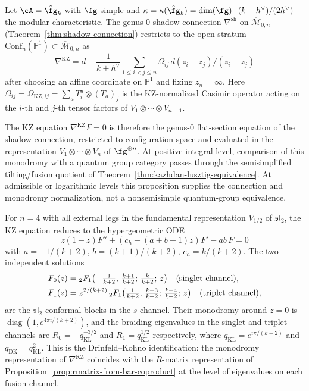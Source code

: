 \begin{proposition}
\label{prop:kz-from-shadow}
Let $\cA = \hat\fg_k$ with $\fg$ simple and
$\kappa = \kappa(\hat\fg_k) = \dim(\fg) \cdot (k + h^\vee)/(2h^\vee)$
the modular characteristic. The genus-$0$ shadow connection
$\nabla^{\mathrm{sh}}$ on $\overline{\mathcal{M}}_{0,n}$
\textup{(}Theorem~\textup{\ref{thm:shadow-connection})} restricts to
the open stratum $\mathrm{Conf}_n(\mathbb{P}^1) \subset
\overline{\mathcal{M}}_{0,n}$ as
\begin{equation}\label{eq:kz-from-shadow}
\nabla^{\mathrm{KZ}}
= d - \frac{1}{k + h^\vee}
 \sum_{1 \le i < j \le n}
 \Omega_{ij}\, d(z_i - z_j)/(z_i - z_j)
\end{equation}
after choosing an affine coordinate on $\mathbb{P}^1$ and
fixing $z_n = \infty$. Here
$\Omega_{ij}=\Omega_{\mathrm{KZ},ij}
=\sum_a T^a_i \otimes (T_a)_j$ is the KZ-normalized Casimir operator
acting on the $i$-th and $j$-th tensor factors of
$V_1 \otimes \cdots \otimes V_{n-1}$.

The KZ equation $\nabla^{\mathrm{KZ}} F = 0$ is therefore the
genus-$0$ flat-section equation of the shadow connection,
restricted to configuration space and evaluated in the representation
$V_1 \otimes \cdots \otimes V_n$ of $\fg^{\oplus n}$.
At positive integral level, comparison of this monodromy with a
quantum group category passes through the semisimplified
tilting/fusion quotient of
Theorem~\ref{thm:kazhdan-lusztig-equivalence}. At admissible or
logarithmic levels this proposition supplies the connection and
monodromy normalization, not a nonsemisimple quantum-group
equivalence.

For $n = 4$ with all external legs in the fundamental representation
$V_{1/2}$ of $\mathfrak{sl}_2$, the KZ equation reduces to the
hypergeometric ODE
\[
z(1-z) F'' + (c_h - (a + b + 1)z) F' - ab\, F = 0
\]
with $a = -1/(k+2)$, $b = (k+1)/(k+2)$, $c_h = k/(k+2)$. The
two independent solutions
\begin{align}
\label{eq:kz-singlet}
F_0(z) &= {}_2F_1\bigl(-\tfrac{1}{k+2},\,
 \tfrac{k+1}{k+2};\,\tfrac{k}{k+2};\, z\bigr)
\quad\textup{(singlet channel)}, \\
\label{eq:kz-triplet}
F_1(z) &= z^{2/(k+2)}\,
{}_2F_1\bigl(\tfrac{1}{k+2},\,
 \tfrac{k+3}{k+2};\,\tfrac{k+4}{k+2};\, z\bigr)
\quad\textup{(triplet channel)},
\end{align}
are the $\mathfrak{sl}_2$ conformal blocks in the $s$-channel.
Their monodromy around $z = 0$ is
$\operatorname{diag}(1, e^{4\pi i/(k+2)})$, and the braiding
eigenvalues in the singlet and triplet channels are
$R_0 = -q_{\mathrm{KL}}^{-3/2}$ and
$R_1 = q_{\mathrm{KL}}^{1/2}$ respectively, where
$q_{\mathrm{KL}} = e^{i\pi/(k+2)}$ and
$q_{\mathrm{DK}}=q_{\mathrm{KL}}^2$. This is the
Drinfeld--Kohno identification:
the monodromy representation of $\nabla^{\mathrm{KZ}}$ coincides
with the $R$-matrix representation of
Proposition~\textup{\ref{prop:rmatrix-from-bar-coproduct}} at the level of
eigenvalues on each fusion channel.
\end{proposition}

